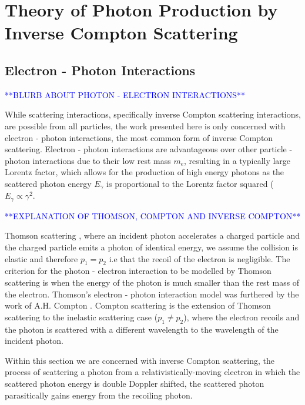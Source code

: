 \documentclass[../main.tex]{subfiles}
\begin{document}
\chapter{Theory of Photon Production by Inverse Compton Scattering}
\label{Theory_of_Photon_Production_by_Inverse_Compton_Scattering} %

\section{Electron - Photon Interactions}
\label{sec:electron_photon_interactions}
\textcolor{blue}{**BLURB ABOUT PHOTON - ELECTRON INTERACTIONS**}

While scattering interactions, specifically inverse Compton scattering interactions, are possible from all particles, the work presented here is only concerned with electron - photon interactions, the most common form of inverse Compton scattering.  Electron - photon interactions are advantageous over other particle - photon interactions due to their low rest mass $m_{e}$, resulting in a typically large Lorentz factor, which allows for the production of high energy photons as the scattered photon energy $E_{\gamma}$ is proportional to the Lorentz factor squared ($E_{\gamma}\propto\gamma^{2}$.    

\textcolor{blue}{**EXPLANATION OF THOMSON, COMPTON AND INVERSE COMPTON**}

Thomson scattering \cite{thomson1904xxxiv}, where an incident photon accelerates a charged particle and the charged particle emits a photon of identical energy, we assume the collision is elastic and therefore $p_{1} = p_{2}$ i.e that the recoil of the electron is negligible. The criterion for the photon - electron interaction to be modelled by Thomson scattering is when the energy of the photon is much smaller than the rest mass of the electron. Thomson's electron - photon interaction model was furthered by the work of A.H. Compton \cite{compton1923quantum}. Compton scattering is the extension of Thomson scattering to the inelastic scattering case ($p_{1} \neq p_{2}$), where the electron recoils and the photon is scattered with a different wavelength to the wavelength of the incident photon.

Within this section we are concerned with inverse Compton scattering, the process of scattering a photon from a relativistically-moving  electron in which the scattered photon energy is double Doppler shifted, the scattered photon parasitically gains energy from the recoiling photon.  
\end{document}
